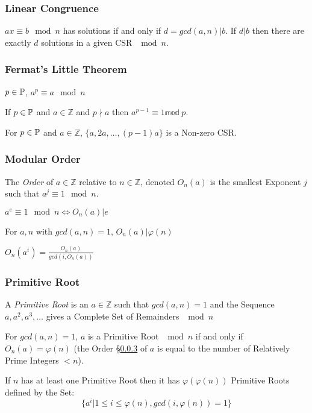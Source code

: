 \subsubsection{Linear Congruence}\label{sec:linear_congruence}

$ax \equiv b \mod n$ has solutions if and only if $d = gcd(a,n) | b$.
If $d|b$ then there are exactly $d$ solutions in a given CSR $\mod n$.



\subsubsection{Fermat's Little Theorem}\label{sec:fermat_little}

$p \in \mathbb{P}$, $a^p \equiv a \mod n$

If $p \in \mathbb{P}$ and $a \in \mathbb{Z}$ and $p \nmid a$ then
$a^{p-1} \equiv 1 \mathbb{mod}\;p$.

For $p \in \mathbb{P}$ and $a \in \mathbb{Z}$, $\{ a, 2a, \ldots, (p-1)a
\}$ is a Non-zero CSR.



\subsubsection{Modular Order}\label{sec:modular_order}

The \emph{Order} of $a \in \mathbb{Z}$ relative to $n \in \mathbb{Z}$,
denoted $O_n(a)$ is the smallest Exponent $j$ such that $a^j \equiv 1
\mod n$.

$a^e \equiv 1 \mod n \Leftrightarrow O_n(a) | e$

For $a, n$ with $gcd(a,n) = 1$, $O_n(a) | \varphi(n)$

$O_n(a^i) = \frac{O_n(a)}{gcd(i,O_n(a))}$



\subsubsection{Primitive Root}\label{sec:primitive_root}

A \emph{Primitive Root} is an $a \in \mathbb{Z}$ such that $gcd(a,n) =
1$ and the Sequence $a, a^2, a^3, \ldots$ gives a Complete Set of
Remainders $\mod n$

For $gcd(a,n) = 1$, $a$ is a Primitive Root $\mod n$ if and only if
$O_n(a) = \varphi(n)$ (the Order \S\ref{sec:modular_order} of $a$ is
equal to the number of Relatively Prime Integers $< n$).

If $n$ has at least one Primitive Root then it has
$\varphi(\varphi(n))$ Primitive Roots defined by the Set:
\[
  \{ a^i | 1 \leq i \leq \varphi(n), gcd(i,\varphi(n)) = 1 \}
\]

